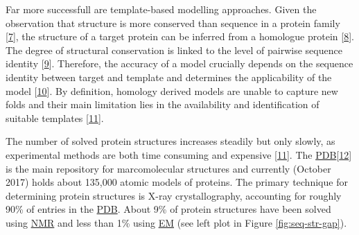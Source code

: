 \documentclass[11pt,a4paper,twoside]{book}
\theoremstyle{definition}
\theoremstyle{definition}
\theoremstyle{remark}
\begin{document}
Far more successfull are template-based modelling approaches. Given the
observation that structure is more conserved than sequence in a protein
family {[}\protect\hyperlink{ref-Lesk1980}{7}{]}, the structure of a
target protein can be inferred from a homologue protein
{[}\protect\hyperlink{ref-Sander1991}{8}{]}. The degree of structural
conservation is linked to the level of pairwise sequence identity
{[}\protect\hyperlink{ref-Chothia1986}{9}{]}. Therefore, the accuracy of
a model crucially depends on the sequence identity between target and
template and determines the applicability of the model
{[}\protect\hyperlink{ref-Marti-Renom2000}{10}{]}. By definition,
homology derived models are unable to capture new folds and their main
limitation lies in the availability and identification of suitable
templates {[}\protect\hyperlink{ref-Dorn2014}{11}{]}.

The number of solved protein structures increases steadily but only
slowly, as experimental methods are both time consuming and expensive
{[}\protect\hyperlink{ref-Dorn2014}{11}{]}. The
\protect\hyperlink{abbrev}{PDB}{[}\protect\hyperlink{ref-Berman2000}{12}{]}
is the main repository for marcomolecular structures and currently
(October 2017) holds about 135,000 atomic models of proteins. The
primary technique for determining protein structures is X-ray
crystallography, accounting for roughly 90\% of entries in the
\protect\hyperlink{abbrev}{PDB}. About 9\% of protein structures have
been solved using \protect\hyperlink{abbrev}{NMR} and less than 1\%
using \protect\hyperlink{abbrev}{EM} (see left plot in Figure
\ref{fig:seq-str-gap}).
\end{document}
